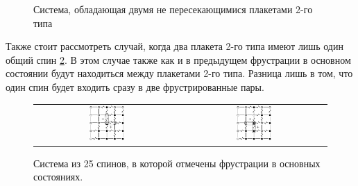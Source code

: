 \documentclass[utf8, babel, sor, jor, amsmath, amssymb, reprint]{elsarticle} %
\begin{document}
\begin{figure}[H]
	\centering
	\caption{Система, обладающая двумя не пересекающимися плакетами 2-го типа}
	\label{fig:4x7}
\end{figure}

Также стоит рассмотреть случай, когда два плакета 2-го типа имеют лишь один общий спин \ref{fig:5x5.22F}. В этом случае также как и в предыдущем фрустрации в основном состоянии будут находиться между плакетами 2-го типа. Разница лишь в том, что один спин будет входить сразу в две фрустрированные пары.

\begin{figure}[H]
	\centering
	\begin{tabular}{cc}
		\includegraphics[width=0.25\textwidth]{pictures/Cl5x5_Type2_gs1.eps} & \hspace{0.05\textwidth}
		\includegraphics[width=0.25\textwidth]{pictures/Cl5x5_Type2_gs2.eps} 
	\end{tabular}
	\caption{Система из 25 спинов, в которой отмечены фрустрации в основных состояниях.}
	\label{fig:5x5.22F}
\end{figure}
\end{document}
